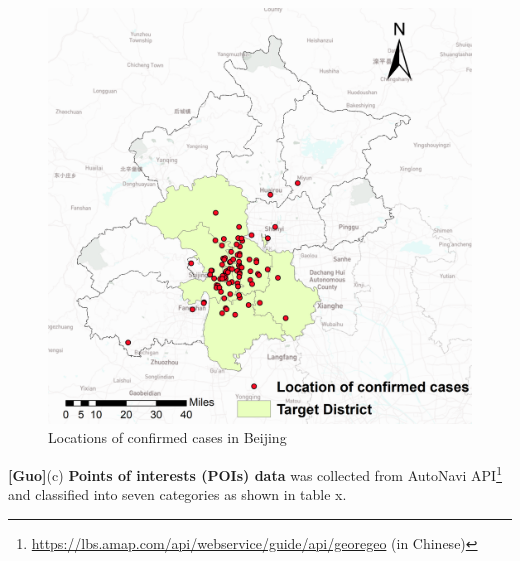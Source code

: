 \documentclass[preprints,ijgi,submit,moreauthors]{Definitions/mdpi}
\begin{document}
\begin{figure}[H]
    \centering
    \includegraphics[width=.5\textwidth]{Figures/Plot_location_confirmed_cases.png}
    \caption{Locations of confirmed cases in Beijing}
    \label{fig:locations of confirmed cases}
\end{figure}


\textbf{[Guo]}(c) \textbf{Points of interests (POIs) data} was collected from AutoNavi API\footnote{\url{https://lbs.amap.com/api/webservice/guide/api/georegeo} (in Chinese)} and classified into seven categories as shown in table x. 
\end{document}
